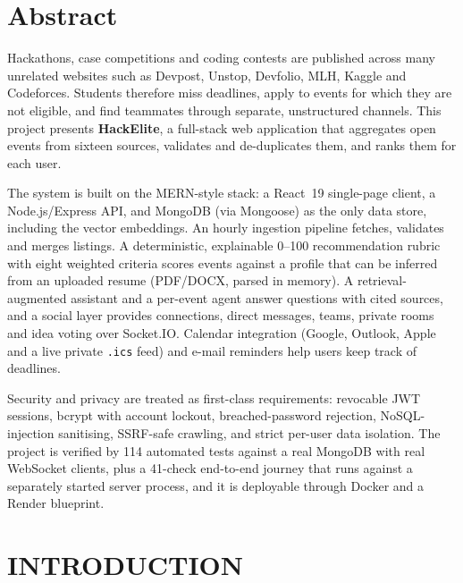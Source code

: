 \documentclass[12pt,a4paper]{report}
\begin{document}
\clearpage

\chapter*{Abstract}

Hackathons, case competitions and coding contests are published across many unrelated websites such as Devpost, Unstop, Devfolio, MLH, Kaggle and Codeforces. Students therefore miss deadlines, apply to events for which they are not eligible, and find teammates through separate, unstructured channels. This project presents \textbf{HackElite}, a full-stack web application that aggregates open events from sixteen sources, validates and de-duplicates them, and ranks them for each user.

The system is built on the MERN-style stack: a React~19 single-page client, a Node.js/Express API, and MongoDB (via Mongoose) as the only data store, including the vector embeddings. An hourly ingestion pipeline fetches, validates and merges listings. A deterministic, explainable 0--100 recommendation rubric with eight weighted criteria scores events against a profile that can be inferred from an uploaded resume (PDF/DOCX, parsed in memory). A retrieval-augmented assistant and a per-event agent answer questions with cited sources, and a social layer provides connections, direct messages, teams, private rooms and idea voting over Socket.IO. Calendar integration (Google, Outlook, Apple and a live private \texttt{.ics} feed) and e-mail reminders help users keep track of deadlines.

Security and privacy are treated as first-class requirements: revocable JWT sessions, bcrypt with account lockout, breached-password rejection, NoSQL-injection sanitising, SSRF-safe crawling, and strict per-user data isolation. The project is verified by 114 automated tests against a real MongoDB with real WebSocket clients, plus a 41-check end-to-end journey that runs against a separately started server process, and it is deployable through Docker and a Render blueprint.

\clearpage

\tableofcontents
\clearpage
\listoffigures
{}
\clearpage
\listoftables
{}
\clearpage

\chapter{INTRODUCTION}
\end{document}
